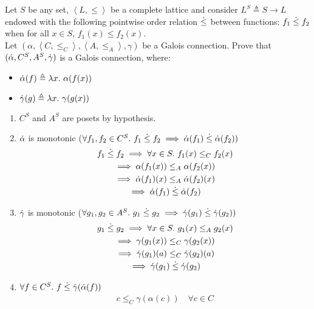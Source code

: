 \begin{exercise}{
    Let $S$ be any set, $\left<L, \leq\right>$ be a complete lattice and consider $L^S \triangleq S \to L$ endowed with the following pointwise order relation $\mathrel{\dot{\leq}}$ between functions: $f_1 \mathrel{\dot{\leq}} f_2$ when for all $x \in S$, $f_1(x) \leq f_2(x)$. \\
    Let $(\alpha, \left<C, \leq_C\right>, \left<A, \leq_A\right>, \gamma)$ be a Galois connection. Prove that $(\dot{\alpha}, C^S, A^S, \dot{\gamma})$ is a Galois connection, where:
    \begin{itemize}
        \item $\dotalpha(f) \triangleq \lambda x.\ \alpha(f(x))$
        \item $\dotgamma(g) \triangleq \lambda x.\ \gamma(g(x))$
    \end{itemize}
}
    \begin{enumerate}[1.]
        \item $C^S$ and $A^S$ are posets by hypothesis.
        \item $\dot{\alpha}$ is monotonic ($\forall f_1, f_2 \in C^S.\ f_1 \mathrel{\dot{\leq}} f_2 \implies \dot{\alpha}(f_1) \mathrel{\dot{\leq}} \dot{\alpha}(f_2))$
        \begin{gather*}
            f_1 \mathrel{\dot{\leq}} f_2 \implies \forall x \in S.\ f_1(x) \leq_C f_2(x) \\
            \implies \alpha(f_1(x)) \leq_A \alpha(f_2(x)) \\
            \implies \dot{\alpha}(f_1)(x) \leq_A \dot{\alpha}(f_2)(x) \\
            \implies \dot{\alpha}(f_1) \mathrel{\dot{\leq}} \dot{\alpha}(f_2)
        \end{gather*}
        \item $\dot{\gamma}$ is monotonic ($\forall g_1, g_2 \in A^S.\ g_1 \mathrel{\dot{\leq}} g_2 \implies \dot{\gamma}(g_1) \mathrel{\dot{\leq}} \dot{\gamma}(g_2))$
        \begin{gather*}
            g_1 \mathrel{\dot{\leq}} g_2 \implies \forall x \in S.\ g_1(x) \leq_A g_2(x) \\
            \implies \gamma(g_1(x)) \leq_C \gamma(g_2(x)) \\
            \implies \dot{\gamma}(g_1)(a) \leq_C \dot{\gamma}(g_2)(a) \\
            \implies \dot{\gamma}(g_1) \mathrel{\dot{\leq}} \dot{\gamma}(g_2)
        \end{gather*}
        \item $\forall f \in C^S.\ f \mathrel{\dot{\leq}} \dot{\gamma}(\dot{\alpha}(f))$
        \begin{gather*}
            c \leq_C \gamma(\alpha(c)) \quad \forall c \in C \\

\end{gather*}
\end{enumerate}
\end{exercise}
